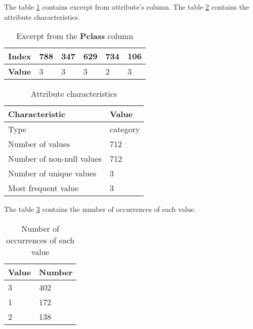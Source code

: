 The table \ref{table:pclass_head} contains excerpt from attribute's column.
The table \ref{table:pclass_characteristics} contains the attribute 
characteristics.

\begin{table}[!hp]
    \centering
    \caption{Excerpt from the \textbf{Pclass} column}
    \begin{tabular}{|l|l|l|l|l|l|}
        \hline
        \textbf{Index} & 788 & 347 & 629 & 734 & 106 \\ \hline
        \textbf{Value} & 3   & 3   & 3   & 2   & 3   \\ \hline
    \end{tabular}
    \label{table:pclass_head}
\end{table}

\begin{table}[!hp]
    \centering
    \caption{Attribute characteristics}
    \begin{tabular}{|l|l|}
        \hline
        \textbf{Characteristic}   & \textbf{Value} \\ \hline
        Type                      & category       \\ \hline
        Number of values          & 712            \\ \hline
        Number of non-null values & 712            \\ \hline
        Number of unique values   & 3              \\ \hline
        Most frequent value       & 3              \\ \hline
    \end{tabular}
    \label{table:pclass_characteristics}
\end{table}

The table \ref{table:pclass_value_counts} contains the number of occurrences of
each value.

\begin{table}[!hp]
    \centering
    \caption{Number of occurrences of each value}
    \begin{tabular}{|l|l|}
        \hline
        \textbf{Value} & \textbf{Number} \\ \hline
        3              & 402             \\ \hline
        1              & 172             \\ \hline
        2              & 138             \\ \hline
    \end{tabular}
    \label{table:pclass_value_counts}
\end{table}

